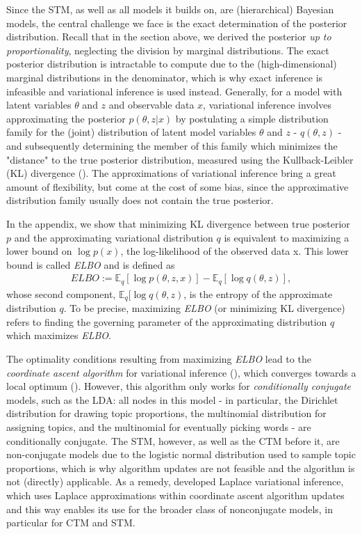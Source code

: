 Since the STM, as well as all models it builds on, are (hierarchical) Bayesian models, the central challenge we face is the exact determination of the posterior distribution. Recall that in the section above, we derived the posterior \textit{up to proportionality}, neglecting the division by marginal distributions. The exact posterior distribution is intractable to compute due to the (high-dimensional) marginal distributions in the denominator, which is why exact inference is infeasible and variational inference is used instead. Generally, for a model with latent variables $\theta$ and $z$ and observable data $x$, variational inference involves approximating the posterior $p(\theta,z|x)$ by postulating a simple distribution family for the (joint) distribution of latent model variables $\theta$ and $z$ - $q(\theta,z)$ - and subsequently determining the member of this family which minimizes the "distance" to the true posterior distribution, measured using the Kullback-Leibler (KL) divergence (\citealp{wang2013variational}). The approximations of variational inference bring a great amount of flexibility, but come at the cost of some bias, since the approximative distribution family usually does not contain the true posterior.

In the appendix, we show that minimizing KL divergence between true posterior $p$ and the approximating variational distribution $q$ is equivalent to maximizing a lower bound on $\log p(x)$, the log-likelihood of the observed data x. This lower bound is called \textit{ELBO} and is defined as
\begin{align*}
ELBO := \mathbb{E}_q[\log p(\theta,z,x)] - \mathbb{E}_q[\log q(\theta,z)],
\end{align*}
whose second component, $\mathbb{E}_q[\log q(\theta,z)$, is the entropy of the approximate distribution $q$. To be precise, maximizing \textit{ELBO} (or minimizing KL divergence) refers to finding the governing parameter of the approximating distribution $q$ which maximizes \textit{ELBO}.

The optimality conditions resulting from maximizing \textit{ELBO} lead to the \textit{coordinate ascent algorithm} for variational inference (\citealp{wang2013variational}), which converges towards a local optimum (\citealp{bishop2006pattern}). However, this algorithm only works for \textit{conditionally conjugate} models, such as the LDA: all nodes in this model - in particular, the Dirichlet distribution for drawing topic proportions, the multinomial distribution for assigning topics, and the multinomial for eventually picking words - are conditionally conjugate. The STM, however, as well as the CTM before it, are non-conjugate models due to the logistic normal distribution used to sample topic proportions, which is why algorithm updates are not feasible and the algorithm is not (directly) applicable. As a remedy, \cite{wang2013variational} developed Laplace variational inference, which uses Laplace approximations within coordinate ascent algorithm updates and this way enables its use for the broader class of nonconjugate models, in particular for CTM and STM.

